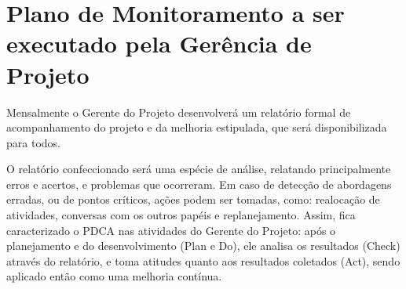 \chapter[Plano de Monitoramento a ser executado pela Gerência de Projeto]{Plano de Monitoramento a ser executado pela Gerência de Projeto}

Mensalmente o Gerente do Projeto desenvolverá um relatório formal de acompanhamento do projeto e da melhoria estipulada, que será disponibilizada para todos.

O relatório confeccionado será uma espécie de análise, relatando principalmente erros e acertos, e problemas que ocorreram. Em caso de detecção de abordagens erradas, ou de pontos críticos, ações podem ser tomadas, como: realocação de atividades, conversas com os outros papéis e replanejamento. Assim, fica caracterizado o PDCA nas atividades do Gerente do Projeto: após o planejamento e do desenvolvimento (Plan e Do), ele analisa os resultados (Check) através do relatório, e toma atitudes quanto aos resultados coletados (Act), sendo aplicado então como uma melhoria contínua.